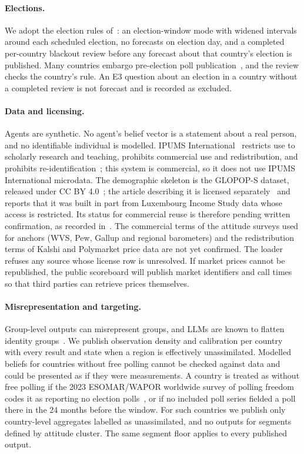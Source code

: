 \documentclass[10pt]{article}
\theoremstyle{remark}
\begin{document}
\paragraph{Elections.} We adopt the election rules of~\cite{rw_governing}: an election-window mode with widened intervals around each scheduled election, no forecasts on election day, and a completed per-country blackout review before any forecast about that country's election is published. Many countries embargo pre-election poll publication~\cite{esomarwapor2023}, and the review checks the country's rule. An E3 question about an election in a country without a completed review is not forecast and is recorded as excluded.

\paragraph{Data and licensing.} Agents are synthetic. No agent's belief vector is a statement about a real person, and no identifiable individual is modelled. IPUMS International~\cite{ipums2025} restricts use to scholarly research and teaching, prohibits commercial use and redistribution, and prohibits re-identification~\cite{ipumsterms}; this system is commercial, so it does not use IPUMS International microdata. The demographic skeleton is the GLOPOP-S dataset, released under CC BY 4.0~\cite{ton2024glopopdata}; the article describing it is licensed separately~\cite{ton2024glopop} and reports that it was built in part from Luxembourg Income Study data whose access is restricted. Its status for commercial reuse is therefore pending written confirmation, as recorded in~\cite{rw_unequally}. The commercial terms of the attitude surveys used for anchors (WVS, Pew, Gallup and regional barometers) and the redistribution terms of Kalshi and Polymarket price data are not yet confirmed. The loader refuses any source whose license row is unresolved. If market prices cannot be republished, the public scoreboard will publish market identifiers and call times so that third parties can retrieve prices themselves.

\paragraph{Misrepresentation and targeting.} Group-level outputs can misrepresent groups, and LLMs are known to flatten identity groups~\cite{wang2024flatten}. We publish observation density and calibration per country with every result and state when a region is effectively unassimilated. Modelled beliefs for countries without free polling cannot be checked against data and could be presented as if they were measurements. A country is treated as without free polling if the 2023 ESOMAR/WAPOR worldwide survey of polling freedom codes it as reporting no election polls~\cite{esomarwapor2023}, or if no included poll series fielded a poll there in the 24 months before the window. For such countries we publish only country-level aggregates labelled as unassimilated, and no outputs for segments defined by attitude cluster. The same segment floor applies to every published output.
\end{document}
